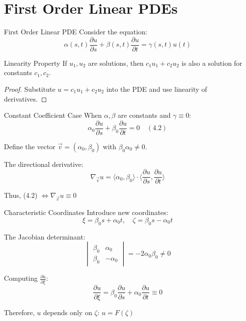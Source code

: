 \documentclass{beamer}
\begin{document}
\section{First Order Linear PDEs}

\begin{frame}{First Order Linear PDE}
    Consider the equation:
    \[
    \alpha(s,t)\frac{\partial u}{\partial s} + \beta(s,t)\frac{\partial u}{\partial t} = \gamma(s,t)u(t)
    \]
    
    \begin{block}{Linearity Property}
        If $u_1, u_2$ are solutions, then $c_1u_1 + c_2u_2$ is also a solution for constants $c_1,c_2$.
    \end{block}
    
    \begin{proof}
        \small
        Substitute $u = c_1u_1 + c_2u_2$ into the PDE and use linearity of derivatives.
    \end{proof}
\end{frame}

\begin{frame}{Constant Coefficient Case}
    When $\alpha,\beta$ are constants and $\gamma \equiv 0$:
    \[
    \alpha_0\frac{\partial u}{\partial s} + \beta_0\frac{\partial u}{\partial t} = 0 \quad (4.2)
    \]
    
    Define the vector $\vec{v} = (\alpha_0, \beta_0)$ with $\beta_0\alpha_0 \neq 0$.
    
    The directional derivative:
    \[
    \nabla_{\vec{v}} u = \langle \alpha_0, \beta_0 \rangle \cdot \langle \frac{\partial u}{\partial s}, \frac{\partial u}{\partial t} \rangle
    \]
    
    Thus, (4.2) $\Leftrightarrow \nabla_{\vec{v}} u \equiv 0$
\end{frame}

\begin{frame}{Characteristic Coordinates}
    Introduce new coordinates:
    \[
    \xi = \beta_0s + \alpha_0t, \quad \zeta = \beta_0s - \alpha_0t
    \]
    
    The Jacobian determinant:
    \[
    \begin{vmatrix}
    \beta_0 & \alpha_0 \\
    \beta_0 & -\alpha_0
    \end{vmatrix} = -2\alpha_0\beta_0 \neq 0
    \]
    
    Computing $\frac{\partial u}{\partial \xi}$:
    \[
    \frac{\partial u}{\partial \xi} = \beta_0\frac{\partial u}{\partial s} + \alpha_0\frac{\partial u}{\partial t} \equiv 0
    \]
    
    Therefore, $u$ depends only on $\zeta$: $u = F(\zeta)$
\end{frame}
\end{document}
